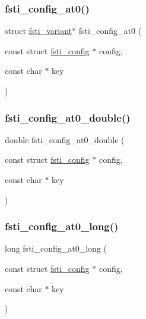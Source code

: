 \mbox{\label{fsti-config_8c_a720dc18f76126042749bd5bab32fcc14}} 
\subsubsection{\texorpdfstring{fsti\+\_\+config\+\_\+at0()}{fsti\_config\_at0()}}
{\footnotesize\ttfamily struct \mbox{\hyperlink{structfsti__variant}{fsti\+\_\+variant}}$\ast$ fsti\+\_\+config\+\_\+at0 (\begin{DoxyParamCaption}\item[{const struct \mbox{\hyperlink{structfsti__config}{fsti\+\_\+config}} $\ast$}]{config,  }\item[{const char $\ast$}]{key }\end{DoxyParamCaption})}

\mbox{\label{fsti-config_8c_a3e479a269882550f86538865a4c76d1e}} 
\subsubsection{\texorpdfstring{fsti\+\_\+config\+\_\+at0\+\_\+double()}{fsti\_config\_at0\_double()}}
{\footnotesize\ttfamily double fsti\+\_\+config\+\_\+at0\+\_\+double (\begin{DoxyParamCaption}\item[{const struct \mbox{\hyperlink{structfsti__config}{fsti\+\_\+config}} $\ast$}]{config,  }\item[{const char $\ast$}]{key }\end{DoxyParamCaption})}

\mbox{\label{fsti-config_8c_a9f3d5723f366dc5de1ed8c23c32db499}} 
\subsubsection{\texorpdfstring{fsti\+\_\+config\+\_\+at0\+\_\+long()}{fsti\_config\_at0\_long()}}
{\footnotesize\ttfamily long fsti\+\_\+config\+\_\+at0\+\_\+long (\begin{DoxyParamCaption}\item[{const struct \mbox{\hyperlink{structfsti__config}{fsti\+\_\+config}} $\ast$}]{config,  }\item[{const char $\ast$}]{key }\end{DoxyParamCaption})}

